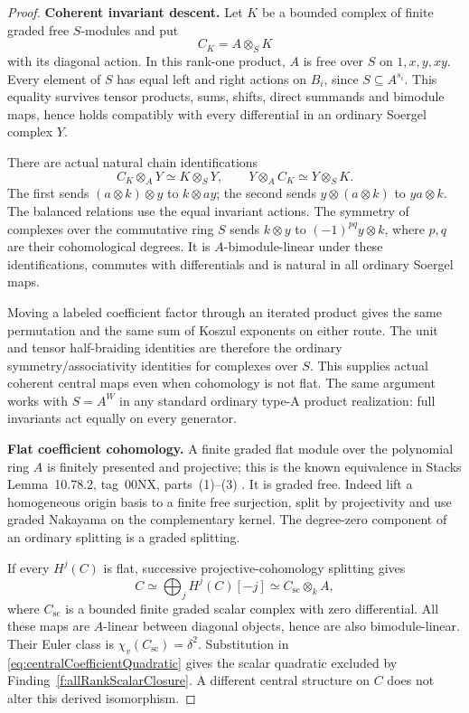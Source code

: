 \documentclass[11pt,a4paper]{article}
\theoremstyle{named}\newtheorem{finding}{Finding}[section]
\theoremstyle{definition}\newtheorem{definition}[finding]{Definition}
\theoremstyle{remark}\newtheorem{remark}[finding]{Remark}
\begin{document}
\begin{proof}
\par\smallskip\noindent\textbf{Coherent invariant descent.}\quad
Let \(K\) be a bounded complex of finite graded
free \(S\)-modules and put
\[
                         C_K=A\otimes_S K
\]
with its diagonal action. In this rank-one product,
\(A\) is free over \(S\) on \(1,x,y,xy\).
Every element of \(S\) has equal left and right
actions on \(B_i\), since \(S\subseteq A^{s_i}\).
This equality survives tensor products, sums,
shifts, direct summands and bimodule maps, hence
holds compatibly with every differential in an
ordinary Soergel complex \(Y\).

There are actual natural chain identifications
\begin{equation}\label{eq:centralCoefficientMovement}
 C_K\otimes_A Y\simeq K\otimes_S Y,
 \qquad
 Y\otimes_A C_K\simeq Y\otimes_S K.
\end{equation}
The first sends \((a\otimes k)\otimes y\) to
\(k\otimes ay\); the second sends
\(y\otimes(a\otimes k)\) to \(ya\otimes k\).
The balanced relations use the equal invariant
actions. The symmetry of complexes over the
commutative ring \(S\) sends
\(k\otimes y\) to \((-1)^{pq}y\otimes k\), where
\(p,q\) are their cohomological degrees.
It is \(A\)-bimodule-linear under these identifications,
commutes with differentials and is natural in all
ordinary Soergel maps.

Moving a labeled coefficient factor through an
iterated product gives the same permutation and
the same sum of Koszul exponents on either route.
The unit and tensor half-braiding identities are
therefore the ordinary symmetry/associativity
identities for complexes over \(S\).
This supplies actual coherent central maps even
when cohomology is not flat.
The same argument works with \(S=A^W\) in any
standard ordinary type-A product realization:
full invariants act equally on every generator.

\par\smallskip\noindent\textbf{Flat coefficient cohomology.}\quad
A finite graded flat module over the polynomial
ring \(A\) is finitely presented and projective;
this is the known equivalence in Stacks
Lemma~10.78.2, tag~00NX, parts~(1)--(3)
\cite{StacksFiniteProjective}.
It is graded free. Indeed lift a homogeneous
origin basis to a finite free surjection, split
by projectivity and use graded Nakayama on the
complementary kernel. The degree-zero component
of an ordinary splitting is a graded splitting.

If every \(H^j(C)\) is flat, successive
projective-cohomology splitting gives
\begin{equation}\label{eq:centralCoefficientScalarReduction}
 C\simeq\bigoplus_jH^j(C)[-j]
      \simeq C_{\mathrm{sc}}\otimes_k A,
\end{equation}
where \(C_{\mathrm{sc}}\) is a bounded finite
graded scalar complex with zero differential.
All these maps are \(A\)-linear between diagonal
objects, hence are also bimodule-linear.
Their Euler class is \(\chi_v(C_{\mathrm{sc}})=\delta^2\).
Substitution in
\eqref{eq:centralCoefficientQuadratic} gives the
scalar quadratic excluded by
Finding~\ref{f:allRankScalarClosure}.
A different central structure on \(C\) does not
alter this derived isomorphism.


\end{proof}
\end{document}
